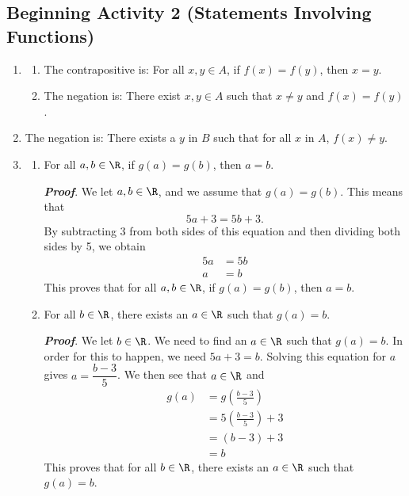 \documentclass[11pt]{article}
\begin{document}
\subsection*{Beginning Activity 2 (Statements Involving Functions)}
\begin{enumerate}
\item \begin{enumerate}
\item The contrapositive is:  For all $x, y \in A$, if 
$f \left( x \right) = f \left( y \right)$, then $x = y$.
\item The negation is:  There exist $x, y \in A$ such that $x \ne y$ and 
$f \left( x \right) = f \left( y \right)$.
\end{enumerate}

\item The negation is:  There exists a $y$ in  $B$ such that for all $x$ in $A$, 
$f \left( x \right) \ne y$.

\item \begin{enumerate}
\item For all $a, b \in \R$, if $g \left( a \right) = g \left( b \right)$, then $a = b$.

\noindent
\textbf{\emph{Proof}}.  We let $a, b \in \R$, and we assume that 
$g \left( a \right) = g \left( b \right)$.  This means that
\[
5a + 3 = 5b + 3.
\]
By subtracting 3 from both sides of this equation and then dividing both sides by 5, we obtain
\begin{align*}
5a &= 5b \\
 a &= b 
\end{align*}
This proves that for all $a, b \in \R$, if $g \left( a \right) = g \left( b \right)$, then 
$a = b$.

\item For all $b \in \R$, there exists an $a \in \R$ such that $g \left( a \right) = b$.

\noindent
\textbf{\emph{Proof}}.  We let $b \in \R$.  We need to find an $a \in \R$ such that 
$g \left( a \right) = b$.  In order for this to happen, we need $5a + 3 = b$.    Solving this equation for $a$ gives $a = \dfrac{b-3}{5}$.  We then see that $a \in \R$ and
\begin{align*}
g \left( a \right) &=g \left( \frac{b-3}{5} \right) \\
                   &= 5 \left( \frac{b-3}{5} \right) + 3 \\
                   &= \left( b - 3 \right) + 3 \\
                   &= b
\end{align*}
This proves that for all $b \in \R$, there exists an $a \in \R$ such that 
$g \left( a \right) = b$.
\end{enumerate}
\end{enumerate}
\end{document}
